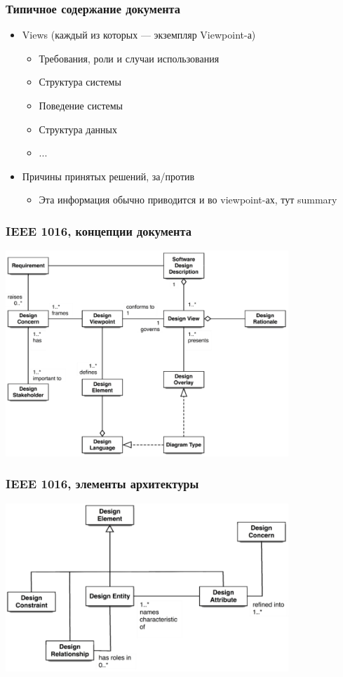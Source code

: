 \documentclass[xetex,mathserif,serif]{beamer}
\begin{document}
	\begin{frame}
		\frametitle{Типичное содержание документа}
		\begin{itemize}
			\item Views (каждый из которых --- экземпляр Viewpoint-а)
			\begin{itemize}
				\item Требования, роли и случаи использования
				\item Структура системы
				\item Поведение системы
				\item Структура данных
				\item ...
			\end{itemize}
			\item Причины принятых решений, за/против
			\begin{itemize}
				\item Эта информация обычно приводится и во viewpoint-ах, тут summary
			\end{itemize}
		\end{itemize}
	\end{frame}

	\begin{frame}
		\frametitle{IEEE 1016, концепции документа}
		\begin{center}
			\includegraphics[width=0.8\textwidth]{ieee1016Concepts.png}
		\end{center}
	\end{frame}

	\begin{frame}
		\frametitle{IEEE 1016, элементы архитектуры}
		\begin{center}
			\includegraphics[width=0.8\textwidth]{ieee1016ArchitectureElements.png}
		\end{center}
	\end{frame}
\end{document}
